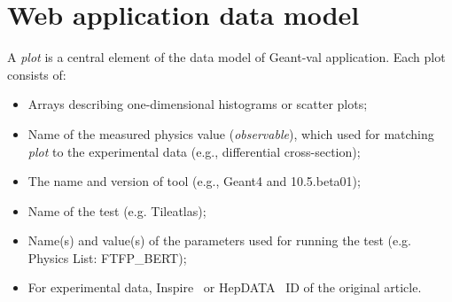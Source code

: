 \vfill\break
\section{Web application data model}

A \textit{plot} is a central element of the data model of \textsf{Geant-val} application. Each plot consists of:
\begin{itemize}
    \item Arrays describing one-dimensional histograms or scatter plots;
    \item Name of the measured physics value (\textit{observable}), which used for matching \textit{plot} to the experimental data (e.g., differential cross-section);
    \item The name and version of tool (e.g., Geant4 and 10.5.beta01);
    \item Name of the test (e.g. Tileatlas);
    \item Name(s) and value(s) of the parameters used for running the test (e.g. Physics List: FTFP\_BERT);
    \item For experimental data, Inspire~\cite{inspire} or HepDATA~\cite{hepdata} ID of the original article.
\end{itemize}